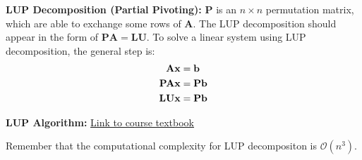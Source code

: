 \documentclass[12pt]{article}
\begin{document}
\newpage
\noindent \textbf{LUP Decomposition (Partial Pivoting):} $\mathbf{P}$ is an $n \times n$ permutation matrix, which are able to exchange some rows of $\mathbf{A}$. The LUP decomposition should appear in the form of $\mathbf{PA }= \mathbf{LU}$. To solve a linear system using LUP decomposition, the general step is: 
    \begin{align*} {\bf Ax} &= {\bf b} \\ {\bf PAx} &= {\bf Pb} \\ {\bf LUx} &= {\bf Pb} \end{align*}

\medskip
\noindent \textbf{LUP Algorithm:} \href{https://cs357.github.io/textbook/notes/linsys.html#the-lup-decomposition-algorithm}{Link to course textbook}

Remember that the computational complexity for LUP decompositon is $\mathcal{O}(n^3)$.
    
\end{document}
